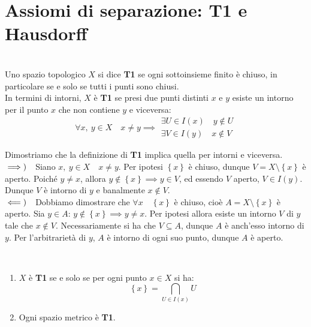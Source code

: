 \section{Assiomi di separazione: T1 e Hausdorff}
\begin{define}[Spazio T1.]~{}\label{T1}\\
Uno spazio topologico $X$ si dice \textbf{T1} se ogni sottoinsieme finito è chiuso, in particolare se e solo se tutti i punti sono chiusi.\\
In termini di intorni, $X$ è \textbf{T1} se presi due punti distinti $x$ e $y$ esiste un intorno per il punto $x$ che non contiene $y$ e viceversa:
\begin{equation}
\forall x,\ y\in X\quad x\neq y\implies
\begin{array}{l}
	\exists U\in I\left(x\right)\quad y\notin U\\
	\exists V\in I\left(y\right)\quad x\notin V
\end{array}
\end{equation}
\vspace{-6mm}
\end{define}
\begin{demonstration} Dimostriamo che la definizione di \textbf{T1} implica quella per intorni e viceversa.\\
$\implies)\quad$Siano $x,\ y\in X\quad x\neq y$. Per ipotesi $\left\{x\right\}$ è chiuso, dunque $V=X\setminus\left\{x\right\}$ è aperto. Poiché $y\neq x$, allora $y\notin\left\{x\right\}\implies y\in V$, ed essendo $V$ aperto, $V\in I\left(y\right)$. Dunque $V$ è intorno di $y$ e banalmente $x\notin V$.\\
$\impliedby)\quad$Dobbiamo dimostrare che $\forall x\quad \left\{x\right\}$ è chiuso, cioè $A=X\setminus\left\{x\right\}$ è aperto. Sia $y\in A$: $y\notin \left\{x\right\}\implies y\neq x$. Per ipotesi allora esiste un intorno $V$ di $y$ tale che $x\notin V$. Necessariamente si ha che $V\subseteq A$, dunque $A$ è anch'esso intorno di $y$. Per l'arbitrarietà di $y$, $A$ è intorno di ogni suo punto, dunque $A$ è aperto.
\end{demonstration}
\begin{observes}~{}
\begin{enumerate}
\item $X$ è \textbf{T1} se e solo se per ogni punto $x\in X$ si ha:
\begin{equation}
\left\{x\right\}=\bigcap_{U\in I\left(x\right)}U
\end{equation}
\item Ogni spazio metrico è \textbf{T1}.
\end{enumerate}
\vspace{-3mm}
\end{observes}
